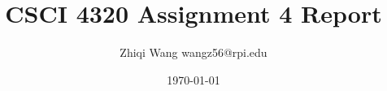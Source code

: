 \documentclass{article}
\begin{document}
\title{\vspace{-3cm}CSCI 4320 Assignment 4 Report}
\author{Zhiqi Wang wangz56@rpi.edu}
\date{\today}
\maketitle
\end{document}
